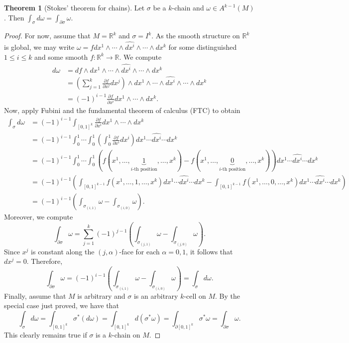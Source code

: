 \documentclass[10pt,letterpaper,cm]{nupset}
\theoremstyle{definition}
\theoremstyle{theorem}
\newtheorem{theorem}[definition]{Theorem}
\theoremstyle{remark}
\newcommand{\R}{\mathbb R}
\newcommand{\1}{\mathbf{1}}
\newcommand{\0}{\vec 0}
\begin{document}
\begin{theorem}[Stokes' theorem for chains]
Let $\sigma$ be a $k$-chain and $\omega \in A^{k-1}(M)$. Then $\int_{\sigma} d\omega = \int_{\partial{\sigma}} \omega$.
\end{theorem}
\begin{proof}
For now, assume that $M= \R^k$ and $\sigma = I^k$. As the smooth structure on $\R^k$ is global, we may write $\omega = fdx^1 \wedge \cdots \wedge \widehat{dx^i} \wedge \cdots \wedge dx^k$ for some distinguished $1\leq i \leq k$ and some smooth $f: \R^k \to \R$. We compute 
\begin{align*}
 d\omega & = df \wedge dx^1 \wedge \cdots \wedge \widehat{dx^i} \wedge \cdots \wedge dx^k
\\ & = \left(\sum_{j=1}^k\frac{\partial{f}}{\partial{x^j}}dx^j \right)\wedge dx^1 \wedge \cdots \wedge \widehat{dx^i} \wedge \cdots \wedge dx^k
\\ & = ({-}1)^{i-1} \frac{\partial{f}}{\partial{x^i}}dx^1 \wedge \cdots \wedge dx^k.
\end{align*}
Now, apply Fubini and the fundamental theorem of calculus (FTC) to obtain
\begin{align*}
 \int_{\sigma}d\omega & = ({-}1)^{i-1}\int_{[0,1]^k} \frac{\partial{f}}{\partial{x^i}}dx^1 \wedge \cdots \wedge dx^k
\\ & = ({-}1)^{i-1}\int_0^1 \cdots \int_0^1 \left(\int_0^1  \frac{\partial{f}}{\partial{x^i}}dx^i \right)dx^1 \cdots \widehat{dx^i}  \cdots dx^k
\\ & = ({-}1)^{i-1}\int_0^1 \cdots \int_0^1(f(x^1, \ldots, \underbrace{1}_{i\text{-th position}}, \ldots, x^k) - f(x^1, \ldots, \underbrace{0}_{i\text{-th position}}, \ldots, x^k))dx^1 \cdots \widehat{dx^i}  \cdots dx^k
\\ & =  ({-}1)^{i-1}\left( \int_{[0,1]^{k-1}} f(x^1, \ldots, 1, \ldots, x^k)dx^1 \cdots \widehat{dx^i}  \cdots dx^k -\int_{[0,1]^{k-1}}f(x^1, \ldots, 0, \ldots, x^k)dx^1 \cdots \widehat{dx^i}  \cdots dx^k \right)
\\ & = ({-}1)^{i-1}\left(\int_{\sigma_{(i, 1)}}\omega - \int_{\sigma_{(i, 0)}}\omega \right) .
\end{align*}
Moreover, we compute
$$ \int_{\partial{\sigma}}\omega = \sum_{j=1}^k({-}1)^{j-1}\left(\int_{\sigma_{(j, 1)}}\omega - \int_{\sigma_{(j, 0)}}\omega \right).$$
Since $x^j$ is constant along the $(j, \alpha)$-face for each $\alpha = 0, 1$, it follows that $dx^j = 0$. Therefore, $$ \int_{\partial{\sigma}}\omega =   ({-}1)^{i-1}\left(\int_{\sigma_{(i, 1)}}\omega - \int_{\sigma_{(i, 0)}}\omega \right) = \int_{\sigma} d\omega.$$
Finally, assume that $M$ is arbitrary and $\sigma $ is an arbitrary $k$-cell on $M$. By the special case just proved, we have that
$$  \int_{\sigma}d\omega = \int_{[0,1]^k}\sigma^{\ast}(d\omega) = \int_{[0,1]^k}d(\sigma^{\ast}\omega) = \int_{\partial{[0,1]^k}}\sigma^{\ast} \omega = \int_{\partial{\sigma}} \omega .$$
This clearly remains true if $\sigma$ is a $k$-chain on $M$.
\end{proof}
\end{document}
